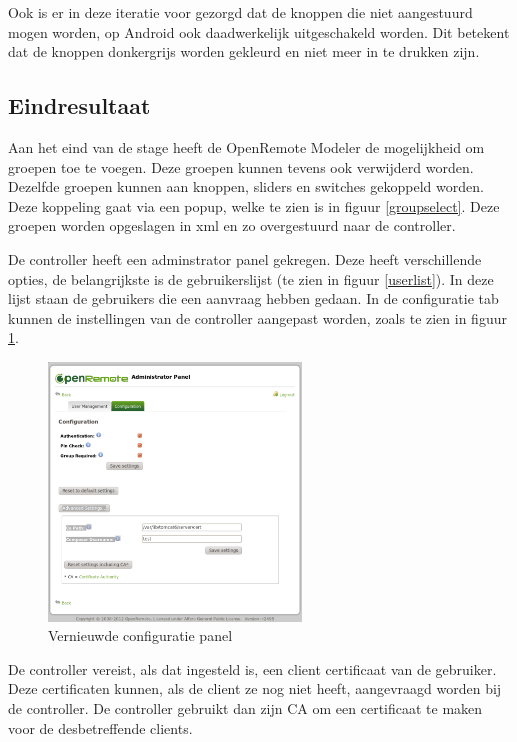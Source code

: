 \documentclass[]{article}
\begin{document}
Ook is er in deze iteratie voor gezorgd dat de knoppen die niet aangestuurd
mogen worden, op Android ook daadwerkelijk uitgeschakeld worden. Dit betekent dat
de knoppen donkergrijs worden gekleurd en niet meer in te drukken zijn.


\subsection{Eindresultaat}
Aan het eind van de stage heeft de OpenRemote Modeler de mogelijkheid om groepen
toe te voegen. Deze groepen kunnen tevens ook verwijderd worden. Dezelfde
groepen kunnen aan knoppen, sliders en switches gekoppeld worden. Deze koppeling
gaat via een popup, welke te zien is in figuur \ref{groupselect}. Deze groepen
worden opgeslagen in xml en zo overgestuurd naar de controller.

De controller heeft een adminstrator panel gekregen. Deze heeft verschillende
opties, de belangrijkste is de gebruikerslijst (te zien in figuur
\ref{userlist}). In deze lijst staan de gebruikers die een aanvraag hebben
gedaan. In de configuratie tab kunnen de instellingen van de controller
aangepast worden, zoals te zien in figuur \ref{configv2}. 

\begin{figure}[h!]
  \centering
    \includegraphics[width=0.6\textwidth,keepaspectratio]{configv2.pdf}
  \caption{Vernieuwde configuratie panel}
  \label{configv2}
\end{figure}

De controller vereist, als dat ingesteld is, een client certificaat van de
gebruiker. Deze certificaten kunnen, als de client ze nog niet heeft,
aangevraagd worden bij de controller. De controller gebruikt dan zijn CA om een
certificaat te maken voor de desbetreffende clients. 
\end{document}
